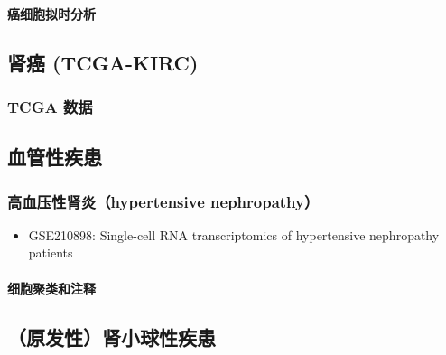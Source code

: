 \documentclass[
]{article}
\providecommand{\tightlist}{%
  \setlength{\itemsep}{0pt}\setlength{\parskip}{0pt}}
\begin{document}
\hypertarget{ux764cux7ec6ux80deux62dfux65f6ux5206ux6790}{%
\paragraph{癌细胞拟时分析}\label{ux764cux7ec6ux80deux62dfux65f6ux5206ux6790}}

\hypertarget{ux80beux764c-tcga-kirc}{%
\subsection{肾癌 (TCGA-KIRC)}\label{ux80beux764c-tcga-kirc}}

\hypertarget{tcga-ux6570ux636e}{%
\subsubsection{TCGA 数据}\label{tcga-ux6570ux636e}}

\hypertarget{ux8840ux7ba1ux6027ux75beux60a3}{%
\subsection{血管性疾患}\label{ux8840ux7ba1ux6027ux75beux60a3}}

\hypertarget{ux9ad8ux8840ux538bux6027ux80beux708ehypertensive-nephropathy}{%
\subsubsection{高血压性肾炎（hypertensive nephropathy）}\label{ux9ad8ux8840ux538bux6027ux80beux708ehypertensive-nephropathy}}

\begin{itemize}
\tightlist
\item
  GSE210898: Single-cell RNA transcriptomics of hypertensive nephropathy patients
\end{itemize}

\hypertarget{ux7ec6ux80deux805aux7c7bux548cux6ce8ux91ca-1}{%
\paragraph{细胞聚类和注释}\label{ux7ec6ux80deux805aux7c7bux548cux6ce8ux91ca-1}}

\hypertarget{ux539fux53d1ux6027ux80beux5c0fux7403ux6027ux75beux60a3}{%
\subsection{（原发性）肾小球性疾患}\label{ux539fux53d1ux6027ux80beux5c0fux7403ux6027ux75beux60a3}}
\end{document}
